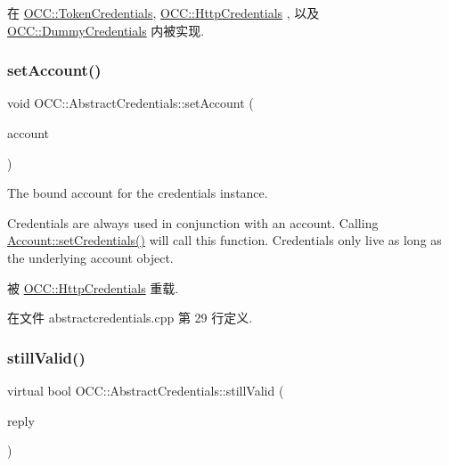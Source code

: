 在 \hyperlink{class_o_c_c_1_1_token_credentials_aa6e69c01e9e6463650d169aae84393e8}{O\+C\+C\+::\+Token\+Credentials}, \hyperlink{class_o_c_c_1_1_http_credentials_afa37b021762c649fe434024130edba4b}{O\+C\+C\+::\+Http\+Credentials} , 以及 \hyperlink{class_o_c_c_1_1_dummy_credentials_a2702abfdea4b6d5158867fd66951fc3a}{O\+C\+C\+::\+Dummy\+Credentials} 内被实现.

\mbox{\label{class_o_c_c_1_1_abstract_credentials_a9dc52ed1c3138adc446aa24c274cf1a8}} 
\subsubsection{\texorpdfstring{set\+Account()}{setAccount()}}
{\footnotesize\ttfamily void O\+C\+C\+::\+Abstract\+Credentials\+::set\+Account (\begin{DoxyParamCaption}\item[{\hyperlink{class_o_c_c_1_1_account}{Account} $\ast$}]{account }\end{DoxyParamCaption})\hspace{0.3cm}{\ttfamily [virtual]}}

The bound account for the credentials instance.

Credentials are always used in conjunction with an account. Calling \hyperlink{class_o_c_c_1_1_account_a254e7934695817014f81b6374a49bad5}{Account\+::set\+Credentials()} will call this function. Credentials only live as long as the underlying account object. 

被 \hyperlink{class_o_c_c_1_1_http_credentials_a630fbda6f313ade505f4bc69c99ed8c6}{O\+C\+C\+::\+Http\+Credentials} 重载.



在文件 abstractcredentials.\+cpp 第 29 行定义.

\mbox{\label{class_o_c_c_1_1_abstract_credentials_a13eca92c3c27886aecd39c6912b7e225}} 
\subsubsection{\texorpdfstring{still\+Valid()}{stillValid()}}
{\footnotesize\ttfamily virtual bool O\+C\+C\+::\+Abstract\+Credentials\+::still\+Valid (\begin{DoxyParamCaption}\item[{Q\+Network\+Reply $\ast$}]{reply }\end{DoxyParamCaption})\hspace{0.3cm}{\ttfamily [pure virtual]}}




